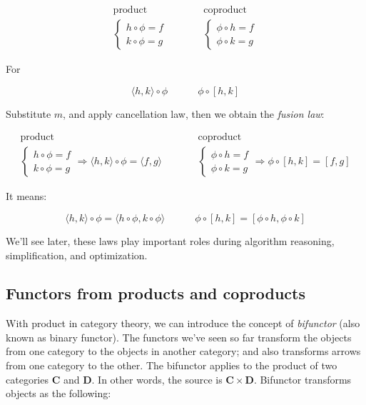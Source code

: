 \documentclass[b5paper]{article}
\begin{document}
\[
\begin{array}{ccc}
  \text{product} & & \text{coproduct} \\
  \begin{cases}
  h \circ \phi = f \\
  k \circ \phi = g
  \end{cases}
  & \quad \quad &
  \begin{cases}
  \phi \circ h = f \\
  \phi \circ k = g
  \end{cases}
\end{array}
\]

For

\[
\langle h, k \rangle \circ \phi \quad \quad \quad \phi \circ [h, k]
\]

Substitute $m$, and apply cancellation law, then we obtain the {\em fusion law}:

\[
\begin{array}{ccc}
  \text{product} & & \text{coproduct} \\
  \begin{cases}
  h \circ \phi = f \\
  k \circ \phi = g
  \end{cases} \Rightarrow
    \langle h, k \rangle \circ \phi = \langle f, g \rangle
  & \quad \quad &
  \begin{cases}
  \phi \circ h = f \\
  \phi \circ k = g
  \end{cases} \Rightarrow
    \phi \circ [h, k] = [f, g]
\end{array}
\]

It means:

\[
\langle h, k \rangle \circ \phi = \langle h \circ \phi, k \circ \phi \rangle
\quad \quad \quad
\phi \circ [h, k] = [\phi \circ h, \phi \circ k]
\]

We'll see later, these laws play important roles during algorithm reasoning, simplification, and optimization.

\subsection{Functors from products and coproducts}
 
With product in category theory, we can introduce the concept of {\em bifunctor} (also known as binary functor). The functors we've seen so far transform the objects from one category to the objects in another category; and also transforms arrows from one category to the other. The bifunctor applies to the product of two categories $\pmb{C}$ and $\pmb{D}$. In other words, the source is $\pmb{C} \times \pmb{D}$. Bifunctor transforms objects as the following:
\end{document}
